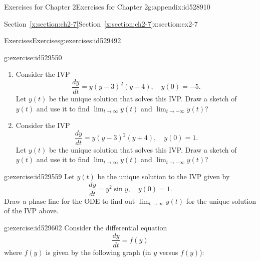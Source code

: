 \documentclass[oneside,10pt,]{book}
\newcommand{\xreffont}{\relax}
\numberwithin{equation}{section}
\numberwithin{equation}{section}
\begin{document}
\begin{appendixptx}{Exercises for Chapter 2}{}{Exercises for Chapter 2}{}{}{g:appendix:id528910}
\begin{sectionptx}{Section~{\xreffont\ref*{x:section:ch2-7}}}{}{Section~{\xreffont\ref*{x:section:ch2-7}}}{}{}{x:section:ex2-7}
\begin{exercises-subsection-numberless}{Exercises}{}{Exercises}{}{}{g:exercises:id529492}
\begin{divisionexercise}{2}{}{}{g:exercise:id529550}
\begin{enumerate}[label=(\alph*)]
\item{}Consider the IVP%
\begin{equation*}
\frac{dy}{dt}=y\left(y-3\right)^{2}\left(y+4\right),\,\,\,\,\,\,y(0)=-5.
\end{equation*}
Let \(y(t)\) be the unique solution that solves this IVP. Draw a sketch of \(y(t)\) and use it to find \(\lim_{t\to\infty}y(t)\) and \(\lim_{t\to-\infty}y(t)\)?%
\item{}Consider the IVP%
\begin{equation*}
\frac{dy}{dt}=y\left(y-3\right)^{2}\left(y+4\right),\,\,\,\,\,\,y(0)=1.
\end{equation*}
Let \(y(t)\) be the unique solution that solves this IVP. Draw a sketch of \(y(t)\) and use it to find \(\lim_{t\to\infty}y(t)\) and \(\lim_{t\to-\infty}y(t)\)?%
\end{enumerate}
\end{divisionexercise}%
\begin{divisionexercise}{3}{}{}{g:exercise:id529559}%
Let \(y(t)\) be the unique solution to the IVP given by%
\begin{equation*}
\frac{dy}{dt}=y^{2}\sin y,\,\,\,\,\,\,y(0)=1.
\end{equation*}
Draw a phase line for the ODE to find out \(\lim_{t\to\infty}y(t)\) for the unique solution of the IVP above.%
\end{divisionexercise}%
\begin{divisionexercise}{4}{}{}{g:exercise:id529602}%
Consider the differential equation%
\begin{equation*}
\frac{dy}{dt}=f\left(y\right)
\end{equation*}
where \(f(y)\) is given by the following graph (in \(y\) versus \(f(y)\)):%
\begin{image}{0}{1}{0}%

\end{image}
\end{divisionexercise}
\end{exercises-subsection-numberless}
\end{sectionptx}
\end{appendixptx}
\end{document}
